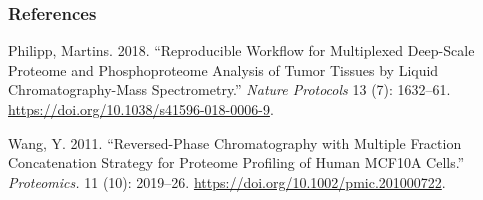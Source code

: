 \documentclass[]{article}
\begin{document}
\hypertarget{references}{%
\subsubsection*{References}\label{references}}

\hypertarget{refs}{}
\leavevmode\hypertarget{ref-mertins2018np}{}%
Philipp, Martins. 2018. ``Reproducible Workflow for Multiplexed
Deep-Scale Proteome and Phosphoproteome Analysis of Tumor Tissues by
Liquid Chromatography-Mass Spectrometry.'' \emph{Nature Protocols} 13
(7): 1632--61. \url{https://doi.org/10.1038/s41596-018-0006-9}.

\leavevmode\hypertarget{ref-wangyy2011proteomics}{}%
Wang, Y. 2011. ``Reversed-Phase Chromatography with Multiple Fraction
Concatenation Strategy for Proteome Profiling of Human MCF10A Cells.''
\emph{Proteomics.} 11 (10): 2019--26.
\url{https://doi.org/10.1002/pmic.201000722}.
\end{document}
